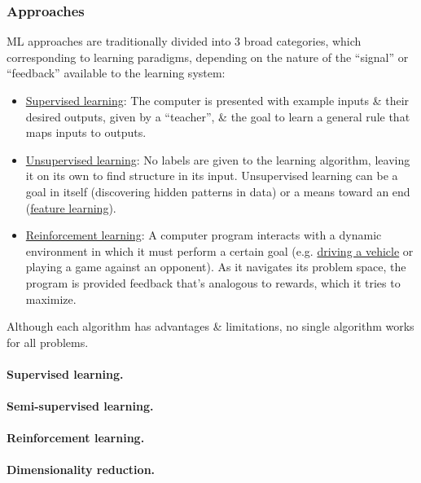 \documentclass{article}
\begin{document}
\subsubsection{Approaches}
ML approaches are traditionally divided into 3 broad categories, which corresponding to learning paradigms, depending on the nature of the ``signal'' or ``feedback'' available to the learning system:
\begin{itemize}
	\item \href{https://en.wikipedia.org/wiki/Supervised_learning}{Supervised learning}: The computer is presented with example inputs \& their desired outputs, given by a ``teacher'', \& the goal to learn a general rule that maps inputs to outputs.
	\item \href{https://en.wikipedia.org/wiki/Unsupervised_learning}{Unsupervised learning}: No labels are given to the learning algorithm, leaving it on its own to find structure in its input. Unsupervised learning can be a goal in itself (discovering hidden patterns in data) or a means toward an end (\href{https://en.wikipedia.org/wiki/Feature_learning}{feature learning}).
	\item \href{https://en.wikipedia.org/wiki/Reinforcement_learning}{Reinforcement learning}: A computer program interacts with a dynamic environment in which it must perform a certain goal (e.g. \href{https://en.wikipedia.org/wiki/Autonomous_car}{driving a vehicle} or playing a game against an opponent). As it navigates its problem space, the program is provided feedback that's analogous to rewards, which it tries to maximize.
\end{itemize}
Although each algorithm has advantages \& limitations, no single algorithm works for all problems.

\paragraph{Supervised learning.}

\paragraph{Semi-supervised learning.}

\paragraph{Reinforcement learning.}

\paragraph{Dimensionality reduction.}
\end{document}
